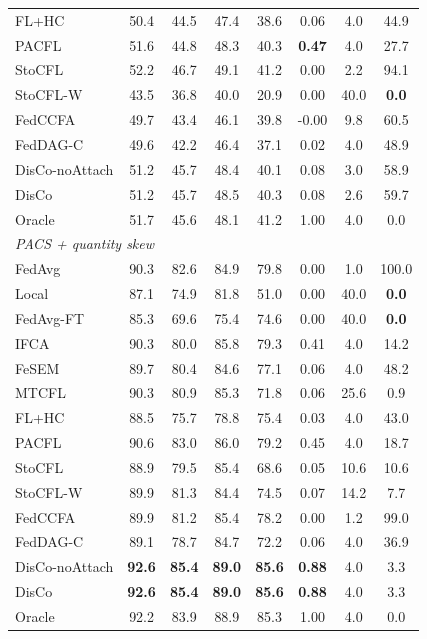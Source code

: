 {\begin{tabular}{lccccccc}
FL+HC & 50.4 & 44.5 & 47.4 & 38.6 & 0.06 & 4.0 & 44.9 \\
PACFL & 51.6 & 44.8 & 48.3 & 40.3 & \textbf{0.47} & 4.0 & 27.7 \\
StoCFL & 52.2 & 46.7 & 49.1 & 41.2 & 0.00 & 2.2 & 94.1 \\
StoCFL-W & 43.5 & 36.8 & 40.0 & 20.9 & 0.00 & 40.0 & \textbf{0.0} \\
FedCCFA & 49.7 & 43.4 & 46.1 & 39.8 & -0.00 & 9.8 & 60.5 \\
FedDAG-C & 49.6 & 42.2 & 46.4 & 37.1 & 0.02 & 4.0 & 48.9 \\
DisCo-noAttach & 51.2 & 45.7 & 48.4 & 40.1 & 0.08 & 3.0 & 58.9 \\
DisCo & 51.2 & 45.7 & 48.5 & 40.3 & 0.08 & 2.6 & 59.7 \\
Oracle & 51.7 & 45.6 & 48.1 & 41.2 & 1.00 & 4.0 & 0.0 \\
\midrule
\multicolumn{8}{l}{\textit{PACS + quantity skew}}\\
FedAvg & 90.3 & 82.6 & 84.9 & 79.8 & 0.00 & 1.0 & 100.0 \\
Local & 87.1 & 74.9 & 81.8 & 51.0 & 0.00 & 40.0 & \textbf{0.0} \\
FedAvg-FT & 85.3 & 69.6 & 75.4 & 74.6 & 0.00 & 40.0 & \textbf{0.0} \\
IFCA & 90.3 & 80.0 & 85.8 & 79.3 & 0.41 & 4.0 & 14.2 \\
FeSEM & 89.7 & 80.4 & 84.6 & 77.1 & 0.06 & 4.0 & 48.2 \\
MTCFL & 90.3 & 80.9 & 85.3 & 71.8 & 0.06 & 25.6 & 0.9 \\
FL+HC & 88.5 & 75.7 & 78.8 & 75.4 & 0.03 & 4.0 & 43.0 \\
PACFL & 90.6 & 83.0 & 86.0 & 79.2 & 0.45 & 4.0 & 18.7 \\
StoCFL & 88.9 & 79.5 & 85.4 & 68.6 & 0.05 & 10.6 & 10.6 \\
StoCFL-W & 89.9 & 81.3 & 84.4 & 74.5 & 0.07 & 14.2 & 7.7 \\
FedCCFA & 89.9 & 81.2 & 85.4 & 78.2 & 0.00 & 1.2 & 99.0 \\
FedDAG-C & 89.1 & 78.7 & 84.7 & 72.2 & 0.06 & 4.0 & 36.9 \\
DisCo-noAttach & \textbf{92.6} & \textbf{85.4} & \textbf{89.0} & \textbf{85.6} & \textbf{0.88} & 4.0 & 3.3 \\
DisCo & \textbf{92.6} & \textbf{85.4} & \textbf{89.0} & \textbf{85.6} & \textbf{0.88} & 4.0 & 3.3 \\
Oracle & 92.2 & 83.9 & 88.9 & 85.3 & 1.00 & 4.0 & 0.0 \\
\bottomrule
\end{tabular}}
